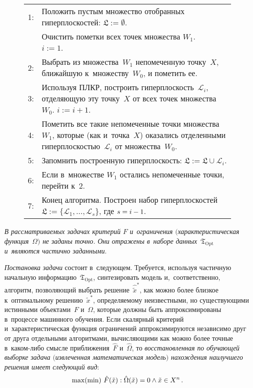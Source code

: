 \begin{multicols}{2}
\begin{figure*}[b]
{\small 
\begin{center}
\begin{tabular}{lp{140mm}}
\hline
1: &Положить пустым множество отобранных гиперплоскостей: 
$\mathfrak{L}:=\emptyset$.\\
&Очистить  пометки всех точек множества $W_1$. \ \ \ $i:=1$.\\
2: &Выбрать из множества~$W_1$ непомеченную точку~$X$, ближайшую к~множеству~$W_0$,
и пометить ее.\\
3: &Используя ПЛКР, построить гиперплоскость~$\mathcal{L}_i$, 
отделяющую эту точку~$X$ от всех точек
множества~$W_0$.  $i:=i+1$.\\
4: &Пометить все такие непомеченные точки множества~$W_1$, 
которые (как и~точка~$X$) оказались
отделенными гиперплоскостью~$\mathcal{L}_i$ от множества~$W_0$.\\
5: &Запомнить построенную гиперплоскость: $\mathfrak{L}:=\mathfrak{L} 
\cup {\mathcal{L}_i}$.\\
6: &Если в~множестве $W_1$ остались непомеченные точки, перейти к~2.\\
7: &Конец алгоритма. Построен набор гиперплоскостей 
$\mathfrak{L}:=\{ \mathcal{L}_1,\dots,\mathcal{L}_s\}$,  где $s\hm=i-1$.\\
\hline
\end{tabular}
\end{center}
}
\end{figure*}


\textit{В рассматриваемых  задачах критерий $F$ и~ограничения 
$($характеристическая функция~$\Omega)$ не заданы точно. Они отражены 
в~наборе данных~$\mathfrak{T}_{\mathrm{Opt}}$ и~являются частично заданными}.

\textit{Постановка задачи} состоит в~следующем. Требуется, используя 
частичную начальную информацию~$\mathfrak{T}_{\mathrm{Opt}}$, 
синтезировать модель 
и,~соответственно, алгоритм, позволяющий выбрать решение~$\hat{\tilde{x}}^{*}$, 
как можно более близкое к~оптимальному решению~$\tilde{x}^{*}$, 
определяемому неизвестными, но существующими истинными объектами~$F$ и~$\Omega$, 
которые должны быть аппроксимированы в~процессе машинного обучения.
Если скалярный критерий и~характеристическая функция ограничений 
аппроксимируются независимо друг от друга отдельными алгоритмами, 
вычисляющими как можно более точные в~ка\-ком-ли\-бо смыс\-ле 
приближения~$\hat{F}$ и~$\hat{\Omega}$, то 
\textit{восстановленная по обучающей выборке задача 
$($извлеченная математическая модель$)$ нахождения наилучшего 
решения имеет следующий вид}: 
$$
\max(\min) \ \hat{F}(\tilde{x}): 
\hat{\Omega}(\tilde{x})=0 \wedge  \tilde{x}\hm\in X^n\,.
$$


\end{multicols}
